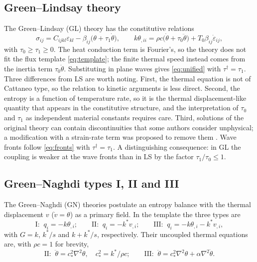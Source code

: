 \subsection{Green--Lindsay theory}\label{sec:gl}
The Green--Lindsay (GL) theory \citep{Green1972} has the constitutive relations
\begin{equation}
\sigma_{ij}=C_{ijkl}\varepsilon_{kl}-\beta_{ij}\bigl(\theta+\tau_1\dot\theta\bigr),\qquad
k\theta_{,ii}=\rho c\bigl(\dot\theta+\tau_0\ddot\theta\bigr)+T_0\beta_{ij}\dot\varepsilon_{ij},\label{eq:GL}
\end{equation}
with $\tau_0\ge\tau_1\ge0$. The heat conduction term is Fourier's, so the theory does not fit the flux template \eqref{eq:template}; the finite thermal speed instead comes from the inertia term $\tau_0\ddot\theta$. Substituting in plane waves gives \eqref{eq:unified} with $\tau^\dagger=\tau_1$. Three differences from LS are worth noting. First, the thermal equation is not of Cattaneo type, so the relation to kinetic arguments is less direct. Second, the entropy is a function of temperature rate, so it is the thermal displacement-like quantity that appears in the constitutive structure, and the interpretation of $\tau_0$ and $\tau_1$ as independent material constants requires care. Third, solutions of the original theory can contain discontinuities that some authors consider unphysical; a modification with a strain-rate term was proposed to remove them \citep{Yu2018ModifiedGL}. Wave fronts follow \eqref{eq:fronts} with $\tau^\dagger=\tau_1$. A distinguishing consequence: in GL the coupling is weaker at the wave fronts than in LS by the factor $\tau_1/\tau_0\le1$.

\subsection{Green--Naghdi types I, II and III}\label{sec:gn}
The Green--Naghdi (GN) theories \citep{Green1991,GreenGN1992,Green1993} postulate an entropy balance with the thermal displacement $v$ ($\dot v=\theta$) as a primary field. In the template the three types are
\begin{equation}
\text{I: }\ q_i=-k\theta_{,i};\qquad
\text{II: }\ q_i=-k^*v_{,i};\qquad
\text{III: }\ q_i=-k\theta_{,i}-k^*v_{,i},
\end{equation}
with $G=k$, $k^*/s$ and $k+k^*/s$, respectively. Their uncoupled thermal equations are, with $\rho c=1$ for brevity,
\begin{equation}
\text{II: }\ \ddot\theta=c_*^2\nabla^2\theta,\quad c_*^2=k^*/\rho c;\qquad
\text{III: }\ \ddot\theta=c_*^2\nabla^2\theta+\alpha\nabla^2\dot\theta.
\end{equation}

